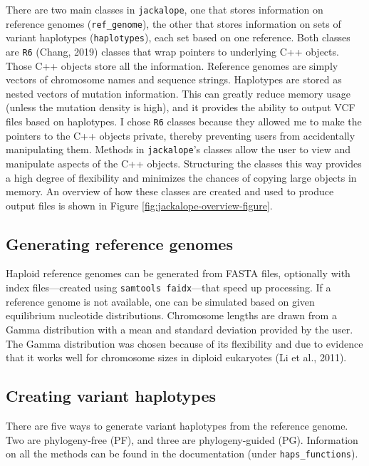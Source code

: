 \documentclass[12pt,]{article}
\begin{document}
There are two main classes in \texttt{jackalope}, one that stores information on reference
genomes (\texttt{ref\_genome}), the other that stores information on sets of variant
haplotypes (\texttt{haplotypes}), each set based on one reference.
Both classes are \texttt{R6} (Chang, 2019) classes that wrap pointers to underlying C++ objects.
Those C++ objects store all the information.
Reference genomes are simply vectors of chromosome names and sequence strings.
Haplotypes are stored as nested vectors of mutation information.
This can greatly reduce memory usage (unless the mutation density is high), and
it provides the ability to output VCF files based on haplotypes.
I chose \texttt{R6} classes because they allowed me to make the pointers to the C++ objects
private, thereby preventing users from accidentally manipulating them.
Methods in \texttt{jackalope}'s classes allow the user to view and manipulate aspects of the
C++ objects.
Structuring the classes this way provides a high degree of flexibility and
minimizes the chances of copying large objects in memory.
An overview of how these classes are created and used to produce output files is shown
in Figure \ref{fig:jackalope-overview-figure}.

\hypertarget{generating-reference-genomes}{%
\subsection{Generating reference genomes}\label{generating-reference-genomes}}

Haploid reference genomes can be generated from FASTA files, optionally with index
files---created using \texttt{samtools\ faidx}---that speed up processing.
If a reference genome is not available, one can be
simulated based on given equilibrium nucleotide distributions.
Chromosome lengths are drawn from a Gamma distribution
with a mean and standard deviation provided by the user.
The Gamma distribution was chosen because of its flexibility and due to evidence
that it works well for chromosome sizes in diploid eukaryotes (Li et al., 2011).

\hypertarget{creating-variant-haplotypes}{%
\subsection{Creating variant haplotypes}\label{creating-variant-haplotypes}}

There are five ways to generate variant haplotypes from the reference genome.
Two are phylogeny-free (PF), and three are phylogeny-guided (PG).
Information on all the methods can be found in the documentation (under \texttt{haps\_functions}).
\end{document}
